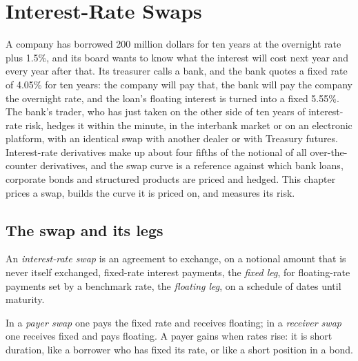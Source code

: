 \chapter{Interest-Rate Swaps}\label{ch:m2:interest-rate-swaps}

A company has borrowed 200 million dollars for ten years at the overnight rate
plus 1.5\%, and its board wants to know what the interest will cost next year
and every year after that. Its treasurer calls a bank, and the bank quotes a
fixed rate of 4.05\% for ten years: the company will pay that, the bank will pay
the company the overnight rate, and the loan's floating interest is turned
into a fixed 5.55\%. The bank's trader, who has just taken on the other side
of ten years of interest-rate risk, hedges it within the minute, in the
interbank market or on an electronic platform, with an identical swap with
another dealer or with Treasury futures. Interest-rate derivatives make up
about four fifths of the notional of all over-the-counter derivatives, and the
swap curve is a reference against which bank loans, corporate bonds and
structured products are priced and hedged. This chapter
prices a swap, builds the curve it is priced on, and measures its risk.

\section{The swap and its legs}

\begin{definition}\label{def:m2:interest-rate-swaps:swap}
An \emph{interest-rate swap} is an agreement to
exchange, on a notional amount that is never itself exchanged, fixed-rate
interest payments, the \emph{fixed leg}, for floating-rate
payments set by a benchmark rate, the \emph{floating leg},
on a schedule of dates until maturity.
\end{definition}

\begin{definition}\label{def:m2:interest-rate-swaps:payer}
In a \emph{payer swap} one pays the fixed rate and receives
floating; in a \emph{receiver swap} one receives fixed and
pays floating. A payer gains when rates rise: it is short duration, like a
borrower who has fixed its rate, or like a short position in a bond.
\end{definition}

